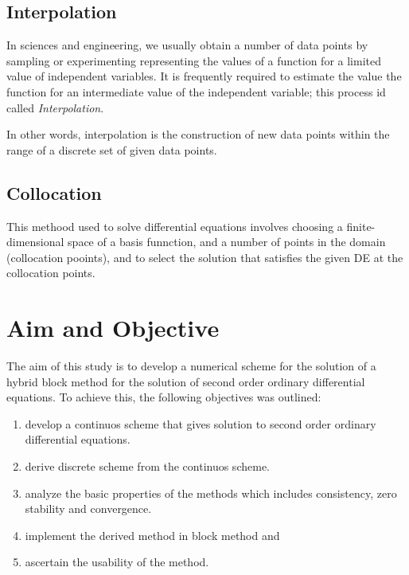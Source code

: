 \documentclass[12pt]{report}
\begin{document}
	\subsection{Interpolation}
	In sciences and engineering, we usually obtain a number of data points by sampling or experimenting representing the values of a function for a limited value of independent variables. It is frequently required to estimate the value the function for an intermediate value of the independent variable; this process id called \textsl{Interpolation}. 
	
	In other words, interpolation is the construction of new data points within the range of a discrete set of given data points.
	\subsection{Collocation}
	This methood used to solve differential equations involves choosing a finite-dimensional space of a basis funnction, and a number of points in the domain (collocation pooints), and to select the solution that satisfies the given DE at the collocation points.

\section*{Aim and Objective}
	The aim of this study is to develop a numerical scheme for the solution of a hybrid block method for the solution of second order ordinary differential equations. To achieve this, the following objectives was outlined:
	\begin{enumerate}
		\item develop a continuos scheme that gives solution to second order ordinary differential equations.
		\item  derive discrete scheme from the continuos scheme.
		\item analyze the basic properties of the methods which includes consistency, zero stability and convergence.
		\item  implement the derived method in block method and
		\item  ascertain the usability of the method.
	\end{enumerate}

\end{document}
